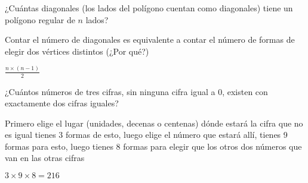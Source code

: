 \documentclass[11pt]{scrartcl}
\begin{document}
\begin{problem}
    ¿Cuántas diagonales (los lados del polígono cuentan como diagonales) tiene un polígono regular de $n$ lados?
    \begin{hint}
        Contar el número de diagonales es equivalente a contar el número de formas de elegir dos vértices distintos (¿Por qué?)
    \end{hint}
    \begin{answer}
        $\frac{n\times(n-1)}{2}$
    \end{answer}
   \end{problem}
   \vspace*{0.1cm}

   \begin{problem}
       ¿Cuántos números de tres cifras, sin ninguna cifra igual a 0, existen con exactamente dos cifras iguales?
       \begin{hint}
           Primero elige el lugar (unidades, decenas o centenas) dónde estará la cifra que no es igual tienes $3$ formas de esto, luego elige el número que estará allí, tienes 9 formas para esto, luego tienes $8$ formas para elegir que los otros dos números que van en las otras cifras
       \end{hint}
       \begin{answer}
           $3\times 9\times 8=216$
       \end{answer}
   \end{problem}
\vspace{0.1cm}
\end{document}

